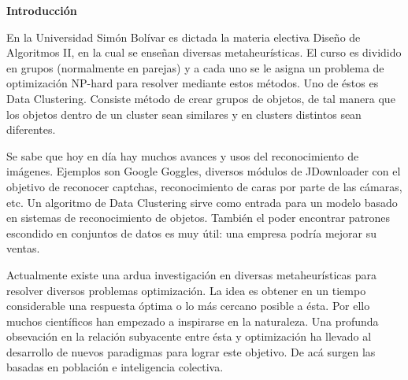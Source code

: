 
\begin{center}
	{\bf Introducci\'on} \label{chap:intro}
\end{center}


\label{sect:motivacion}
\vspace{5 mm}

En la Universidad Sim\'on Bol\'ivar es dictada la materia electiva
Dise\~no de Algoritmos II, en la cual se enseñan diversas metaheur\'isticas.
El curso es dividido en grupos (normalmente en parejas) y a cada uno se le asigna un problema 
de optimizaci\'on NP-hard para resolver mediante estos m\'etodos. Uno de \'estos es Data Clustering.
Consiste m\'etodo de crear grupos de objetos,
de tal manera que los objetos dentro de un cluster sean similares y 
en clusters distintos sean diferentes. \cite{GaChJi2007}

\vspace{5 mm}

\label{sect:justificacion}
\vspace{5 mm}

Se sabe que hoy en d\'ia hay muchos avances y usos del reconocimiento de im\'agenes.
Ejemplos son Google Goggles, diversos m\'odulos de JDownloader con el objetivo de reconocer
captchas, reconocimiento de caras por parte de las c\'amaras, etc. Un algoritmo de
Data Clustering sirve como entrada para un modelo basado en sistemas de
reconocimiento de objetos. Tambi\'en el poder encontrar patrones escondido en
conjuntos de datos es muy \'util: una empresa podr\'ia mejorar su ventas.

\vspace{5 mm}

\label{sect:planteamiento}
\vspace{5 mm}

Actualmente existe una ardua investigaci\'on en diversas metaheur\'isticas para
resolver diversos problemas optimizaci\'on. La idea es obtener en un tiempo
considerable una respuesta \'optima o lo m\'as cercano posible a \'esta. Por
ello muchos cient\'ificos han empezado a inspirarse en la naturaleza.
Una profunda obsevaci\'on en la relaci\'on subyacente 
entre \'esta y optimizaci\'on ha llevado al desarrollo de nuevos paradigmas
para lograr este objetivo\cite{SwAjAm2009}. De ac\'a surgen las basadas en poblaci\'on e inteligencia
colectiva.

